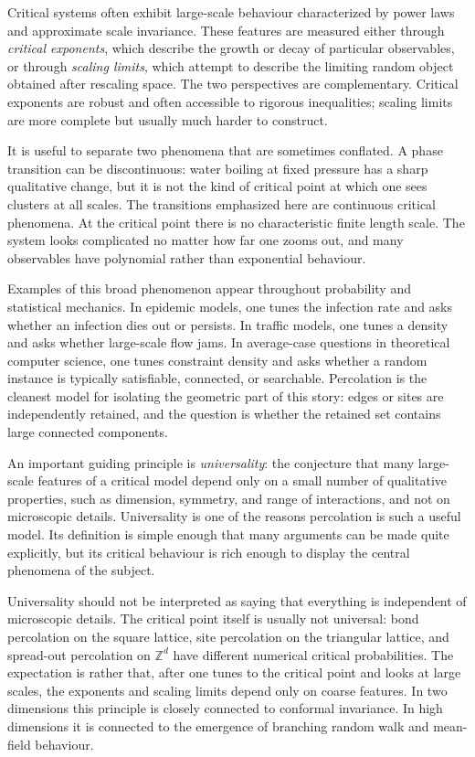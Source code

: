 \documentclass[11pt,reqno]{book}
\numberwithin{equation}{chapter}
\theoremstyle{plain}
\theoremstyle{definition}
\theoremstyle{remark}
\newcommand{\Z}{\mathbb Z}
\newcommand{\1}{\mathbf 1}
\begin{document}
Critical systems often exhibit large-scale behaviour characterized by power laws and approximate scale invariance. These features are measured either through \emph{critical exponents}, which describe the growth or decay of particular observables, or through \emph{scaling limits}, which attempt to describe the limiting random object obtained after rescaling space. The two perspectives are complementary. Critical exponents are robust and often accessible to rigorous inequalities; scaling limits are more complete but usually much harder to construct.

It is useful to separate two phenomena that are sometimes conflated. A phase transition can be discontinuous: water boiling at fixed pressure has a sharp qualitative change, but it is not the kind of critical point at which one sees clusters at all scales. The transitions emphasized here are continuous critical phenomena. At the critical point there is no characteristic finite length scale. The system looks complicated no matter how far one zooms out, and many observables have polynomial rather than exponential behaviour.

Examples of this broad phenomenon appear throughout probability and statistical mechanics. In epidemic models, one tunes the infection rate and asks whether an infection dies out or persists. In traffic models, one tunes a density and asks whether large-scale flow jams. In average-case questions in theoretical computer science, one tunes constraint density and asks whether a random instance is typically satisfiable, connected, or searchable. Percolation is the cleanest model for isolating the geometric part of this story: edges or sites are independently retained, and the question is whether the retained set contains large connected components.

An important guiding principle is \emph{universality}: the conjecture that many large-scale features of a critical model depend only on a small number of qualitative properties, such as dimension, symmetry, and range of interactions, and not on microscopic details. Universality is one of the reasons percolation is such a useful model. Its definition is simple enough that many arguments can be made quite explicitly, but its critical behaviour is rich enough to display the central phenomena of the subject.

Universality should not be interpreted as saying that everything is independent of microscopic details. The critical point itself is usually not universal: bond percolation on the square lattice, site percolation on the triangular lattice, and spread-out percolation on $\Z^d$ have different numerical critical probabilities. The expectation is rather that, after one tunes to the critical point and looks at large scales, the exponents and scaling limits depend only on coarse features. In two dimensions this principle is closely connected to conformal invariance. In high dimensions it is connected to the emergence of branching random walk and mean-field behaviour.
\end{document}
